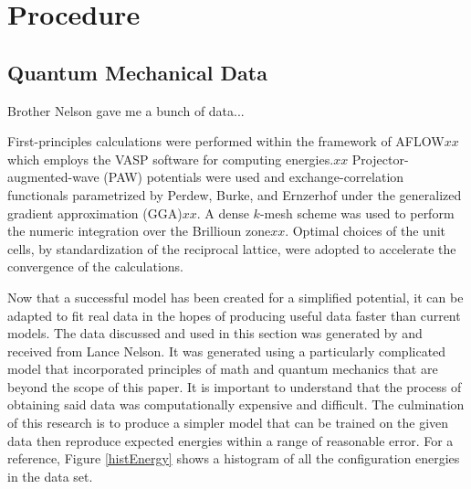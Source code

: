 \section{Procedure}\label{Sect:procedure}
\subsection{Quantum Mechanical Data}\label{Sect:procedureData}
%
%
%
%
%
%
%
%
\par Brother Nelson gave me a bunch of data...
\par First-principles calculations were performed within the framework of AFLOW$xx$ which employs the VASP software for computing energies.$xx$ Projector-augmented-wave (PAW) potentials were used and exchange-correlation functionals parametrized by Perdew, Burke, and Ernzerhof under the generalized gradient approximation (GGA)$xx$. A dense $k$-mesh scheme was used to perform the numeric integration over the Brillioun zone$xx$. Optimal choices of the unit cells, by standardization of the reciprocal lattice, were adopted to accelerate the convergence of the calculations.
\par Now that a successful model has been created for a simplified potential, it can be adapted to fit real data in the hopes of producing useful data faster than current models. The data discussed and used in this section was generated by and received from Lance Nelson. It was generated using a particularly complicated model that incorporated principles of math and quantum mechanics that are beyond the scope of this paper. It is important to understand that the process of obtaining said data was computationally expensive and difficult. The culmination of this research is to produce a simpler model that can be trained on the given data then reproduce expected energies within a range of reasonable error. For a reference, Figure \ref{histEnergy} shows a histogram of all the configuration energies in the data set.

